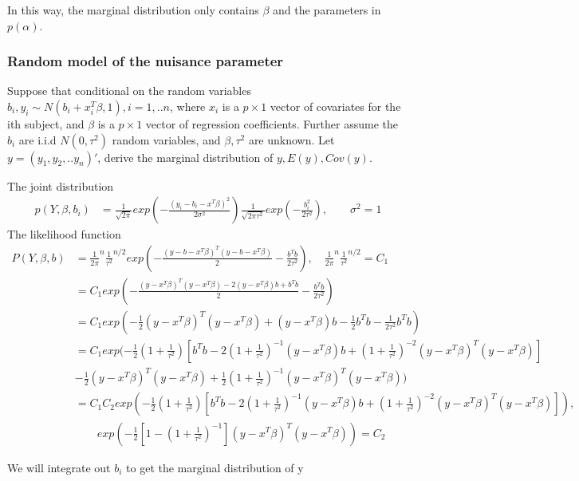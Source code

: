 \documentclass[11pt]{article} %
\begin{document}
In this way, the marginal distribution only contains $\beta$ and the parameters in $p(\alpha)$.


\subsubsection{Random model of the nuisance parameter}
Suppose that conditional on the random variables $b_i, y_i \sim N(b_i + x^T_i\beta, 1), i=1,..n$, where $x_i$ is a $p \times 1$ vector of covariates for the ith subject, and $\beta$ is a $p \times 1$ vector of regression coefficients. Further assume the $b_i$ are i.i.d $N(0, \tau^2)$ random variables, and $\beta, \tau^2$ are unknown. Let $y= (y_1, y_2, .. y_n)'$, derive the marginal distribution of $y, E(y), Cov(y)$. 

The joint distribution
\begin{align*}
	p(Y, \beta, b_i) &= \frac{1}{\sqrt{2 \pi}} exp \left( -\frac{(y_i - b_i -x^T\beta)^2}{2 \sigma^2} \right) \frac{1}{\sqrt{2 \pi \tau^2}}  exp \left( -\frac{b_i^2}{2 \tau^2} \right), \qquad \sigma^2 = 1
\end{align*}
The likelihood function
\begin{align*}
	P(Y, \beta, b) &= \frac{1}{{2 \pi}}^n \frac{1}{{\tau^2}}^{n/2} exp \left( -\frac{(y - b -x^T\beta)^T (y - b -x^T\beta) }{2} -\frac{b^T b}{2 \tau^2} \right)  , \quad \frac{1}{{2 \pi}}^n \frac{1}{{\tau^2}}^{n/2} = C_1\\
	&= C_1 exp \left( -\frac{(y -x^T\beta)^T (y -x^T\beta) -2 (y-x^T\beta)b + b^T b}{2} -\frac{b^T b}{2 \tau^2} \right)  \\
	&= C_1 exp \left( -\frac{1}{2} (y -x^T\beta)^T (y -x^T\beta) + (y-x^T\beta)b -\frac{1}{2} b^T b -\frac{1}{2 \tau^2} b^T b \right)  \\
	&= C_1 exp ( -\frac{1}{2} (1+ \frac{1}{\tau^2}) [b^T b - 2(1+ \frac{1}{\tau^2})^{-1} (y- x^T \beta)b + (1 + \frac{1}{\tau^2})^{-2} (y-x^T\beta)^T (y- x^T\beta)]\\
	& -\frac{1}{2} (y -x^T\beta)^T (y -x^T\beta) + \frac{1}{2} (1+ \frac{1}{\tau^2})^{-1} (y -x^T\beta)^T (y -x^T\beta)  )\\
	&= C_1 C_2 exp ( -\frac{1}{2} (1+ \frac{1}{\tau^2}) [b^T b - 2(1+ \frac{1}{\tau^2})^{-1} (y- x^T \beta)b + (1 + \frac{1}{\tau^2})^{-2} (y-x^T\beta)^T (y- x^T\beta)]), \\
	& \qquad exp(- \frac{1}{2}[1-(1+ \frac{1}{\tau^2})^{-1}]  (y -x^T\beta)^T (y -x^T\beta)) = C_2
\end{align*}

We will integrate out $b_i$ to get the marginal distribution of y 
\end{document}
